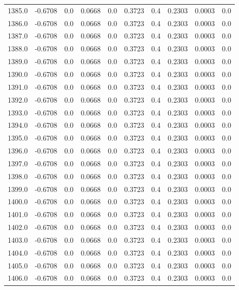\begin{longtable}{lrrrrrrrrr}
1385.0 & -0.6708 & 0.0 & 0.0668 & 0.0 & 0.3723 & 0.4 & 0.2303 & 0.0003 & 0.0 \\
1386.0 & -0.6708 & 0.0 & 0.0668 & 0.0 & 0.3723 & 0.4 & 0.2303 & 0.0003 & 0.0 \\
1387.0 & -0.6708 & 0.0 & 0.0668 & 0.0 & 0.3723 & 0.4 & 0.2303 & 0.0003 & 0.0 \\
1388.0 & -0.6708 & 0.0 & 0.0668 & 0.0 & 0.3723 & 0.4 & 0.2303 & 0.0003 & 0.0 \\
1389.0 & -0.6708 & 0.0 & 0.0668 & 0.0 & 0.3723 & 0.4 & 0.2303 & 0.0003 & 0.0 \\
1390.0 & -0.6708 & 0.0 & 0.0668 & 0.0 & 0.3723 & 0.4 & 0.2303 & 0.0003 & 0.0 \\
1391.0 & -0.6708 & 0.0 & 0.0668 & 0.0 & 0.3723 & 0.4 & 0.2303 & 0.0003 & 0.0 \\
1392.0 & -0.6708 & 0.0 & 0.0668 & 0.0 & 0.3723 & 0.4 & 0.2303 & 0.0003 & 0.0 \\
1393.0 & -0.6708 & 0.0 & 0.0668 & 0.0 & 0.3723 & 0.4 & 0.2303 & 0.0003 & 0.0 \\
1394.0 & -0.6708 & 0.0 & 0.0668 & 0.0 & 0.3723 & 0.4 & 0.2303 & 0.0003 & 0.0 \\
1395.0 & -0.6708 & 0.0 & 0.0668 & 0.0 & 0.3723 & 0.4 & 0.2303 & 0.0003 & 0.0 \\
1396.0 & -0.6708 & 0.0 & 0.0668 & 0.0 & 0.3723 & 0.4 & 0.2303 & 0.0003 & 0.0 \\
1397.0 & -0.6708 & 0.0 & 0.0668 & 0.0 & 0.3723 & 0.4 & 0.2303 & 0.0003 & 0.0 \\
1398.0 & -0.6708 & 0.0 & 0.0668 & 0.0 & 0.3723 & 0.4 & 0.2303 & 0.0003 & 0.0 \\
1399.0 & -0.6708 & 0.0 & 0.0668 & 0.0 & 0.3723 & 0.4 & 0.2303 & 0.0003 & 0.0 \\
1400.0 & -0.6708 & 0.0 & 0.0668 & 0.0 & 0.3723 & 0.4 & 0.2303 & 0.0003 & 0.0 \\
1401.0 & -0.6708 & 0.0 & 0.0668 & 0.0 & 0.3723 & 0.4 & 0.2303 & 0.0003 & 0.0 \\
1402.0 & -0.6708 & 0.0 & 0.0668 & 0.0 & 0.3723 & 0.4 & 0.2303 & 0.0003 & 0.0 \\
1403.0 & -0.6708 & 0.0 & 0.0668 & 0.0 & 0.3723 & 0.4 & 0.2303 & 0.0003 & 0.0 \\
1404.0 & -0.6708 & 0.0 & 0.0668 & 0.0 & 0.3723 & 0.4 & 0.2303 & 0.0003 & 0.0 \\
1405.0 & -0.6708 & 0.0 & 0.0668 & 0.0 & 0.3723 & 0.4 & 0.2303 & 0.0003 & 0.0 \\
1406.0 & -0.6708 & 0.0 & 0.0668 & 0.0 & 0.3723 & 0.4 & 0.2303 & 0.0003 & 0.0 \\

\end{longtable}
